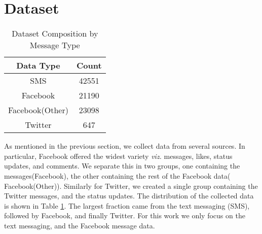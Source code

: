 \section{Dataset}
\begin{table}
\centering
\caption{Dataset Composition by Message Type}
\begin{tabular}{| c | c |}
\hline
\textbf{Data Type} & \textbf{Count} \\
\hline
SMS & 42551\\
\hline
Facebook & 21190\\
\hline
Facebook(Other) & 23098\\
\hline
Twitter & 647\\
\hline
\end{tabular}
\label{table:datasetCompositionMsgT}
\end{table}
As mentioned in the previous section, we collect data from several sources. 
In particular, Facebook offered the widest variety \emph{viz.} messages, likes, status updates, and comments. 
We separate this in two groups, one containing the messages(Facebook), the other containing the rest of the Facebook data( Facebook(Other)). 
Similarly for Twitter, we created a single group containing the Twitter messages, and the status updates. 
The distribution of the collected data is shown in Table \ref{table:datasetCompositionMsgT}. 
The largest fraction came from the text messaging (SMS), followed by Facebook, and finally Twitter. 
For this work we only focus on the text messaging, and the Facebook message data. 

